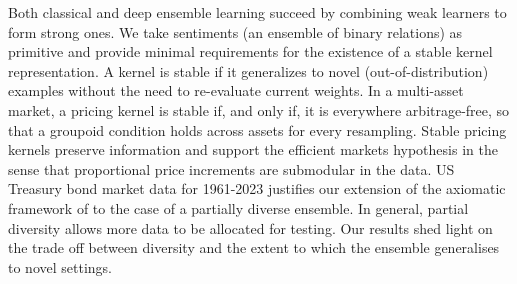%
%
\begin{countabstract}
Both classical and deep ensemble learning succeed by combining weak learners to form strong ones.
We take sentiments (an ensemble of binary relations) as primitive and provide minimal requirements for the existence of a stable kernel representation.
A kernel is stable if it generalizes to novel (out-of-distribution) examples without the need to re-evaluate current weights.
In a multi-asset market, a pricing kernel is stable if, and only if, it is
everywhere arbitrage-free, so that a groupoid condition holds across assets for
every resampling.
Stable pricing kernels preserve information and support the efficient markets hypothesis in the sense that proportional price increments are submodular in the data.
US Treasury bond market data for 1961-2023 justifies our extension of the axiomatic framework of \citet{gilboa2003inductive} to the case of a partially diverse ensemble.
In general, partial diversity allows more data to be allocated for testing.
Our results shed light on the trade off between diversity and the extent to
which the ensemble generalises to novel settings.
\end{countabstract}


